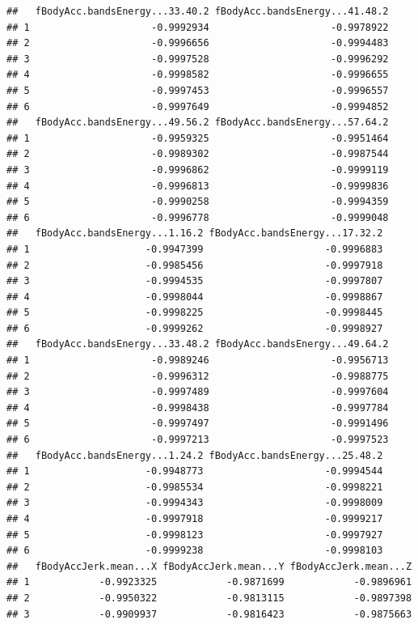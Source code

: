 \documentclass[
]{article}
\begin{document}
\begin{verbatim}
##   fBodyAcc.bandsEnergy...33.40.2 fBodyAcc.bandsEnergy...41.48.2
## 1                     -0.9992934                     -0.9978922
## 2                     -0.9996656                     -0.9994483
## 3                     -0.9997528                     -0.9996292
## 4                     -0.9998582                     -0.9996655
## 5                     -0.9997453                     -0.9996557
## 6                     -0.9997649                     -0.9994852
##   fBodyAcc.bandsEnergy...49.56.2 fBodyAcc.bandsEnergy...57.64.2
## 1                     -0.9959325                     -0.9951464
## 2                     -0.9989302                     -0.9987544
## 3                     -0.9996862                     -0.9999119
## 4                     -0.9996813                     -0.9999836
## 5                     -0.9990258                     -0.9994359
## 6                     -0.9996778                     -0.9999048
##   fBodyAcc.bandsEnergy...1.16.2 fBodyAcc.bandsEnergy...17.32.2
## 1                    -0.9947399                     -0.9996883
## 2                    -0.9985456                     -0.9997918
## 3                    -0.9994535                     -0.9997807
## 4                    -0.9998044                     -0.9998867
## 5                    -0.9998225                     -0.9998445
## 6                    -0.9999262                     -0.9998927
##   fBodyAcc.bandsEnergy...33.48.2 fBodyAcc.bandsEnergy...49.64.2
## 1                     -0.9989246                     -0.9956713
## 2                     -0.9996312                     -0.9988775
## 3                     -0.9997489                     -0.9997604
## 4                     -0.9998438                     -0.9997784
## 5                     -0.9997497                     -0.9991496
## 6                     -0.9997213                     -0.9997523
##   fBodyAcc.bandsEnergy...1.24.2 fBodyAcc.bandsEnergy...25.48.2
## 1                    -0.9948773                     -0.9994544
## 2                    -0.9985534                     -0.9998221
## 3                    -0.9994343                     -0.9998009
## 4                    -0.9997918                     -0.9999217
## 5                    -0.9998123                     -0.9997927
## 6                    -0.9999238                     -0.9998103
##   fBodyAccJerk.mean...X fBodyAccJerk.mean...Y fBodyAccJerk.mean...Z
## 1            -0.9923325            -0.9871699            -0.9896961
## 2            -0.9950322            -0.9813115            -0.9897398
## 3            -0.9909937            -0.9816423            -0.9875663

\end{verbatim}
\end{document}
